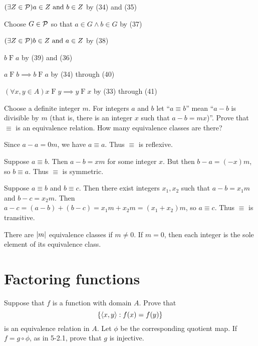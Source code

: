 \begin{solution}
\begin{enumarabic}
    \item \quad\quad $(\exists Z\in\mathcal{P})a\in Z\text{ and } b\in Z$ \hfill by (34) and (35)
    \item \quad\quad Choose $G\in\mathcal{P}$ so that $a\in G\land b\in G$ \hfill by (37)
    \item \quad\quad $(\exists Z\in\mathcal{P})b\in Z\text{ and } a\in Z$ \hfill by (38)
    \item \quad\quad $b\mathrel F a$ \hfill by (39) and (36)
    \item \quad $a\mathrel F b \implies b\mathrel F a$ \hfill by (34) through (40)
    \item $(\forall x, y\in A)x\mathrel F y \implies y \mathrel F x$ \hfill by (33) through (41)
\end{enumarabic}
\end{solution}

\begin{exercise}
Choose a definite integer $m$. For integers $a$ and $b$ let ``$a\equiv b$'' mean
``$a - b$ is divisible by $m$ (that is, there is an integer $x$ such that $a-b=mx$)''.
Prove that $\equiv$ is an equivalence relation. How many equivalence classes are there?
\end{exercise}

\begin{solution}
Since $a-a=0m$, we have $a\equiv a$. Thus $\equiv$ is reflexive.

Suppose $a\equiv b$. Then $a-b=xm$ for some integer $x$. But then $b-a=(-x)m$,
so $b\equiv a$. Thus $\equiv$ is symmetric.

Suppose $a\equiv b$ and $b\equiv c$. Then there exist integers $x_1,x_2$ such that
$a-b=x_1m$ and $b-c=x_2m$.
Then $a-c=(a-b)+(b-c)=x_1m+x_2m=(x_1+x_2)m$, so $a\equiv c$. Thus $\equiv$ is transitive.

There are $\left\lvert m\right\rvert$ equivalence classes if $m\neq 0$. If $m=0$, then each integer is
the sole element of its equivalence class.
\end{solution}
\section{Factoring functions}

\begin{exercise}
Suppose that $f$ is a function with domain $A$. Prove that
\[\left\{ \left\langle x,y\right\rangle : f(x)=f(y) \right\}\]
is an equivalence relation in $A$. Let $\phi$ be the corresponding quotient map.
If $f = g\circ \phi$,
as in 5-2.1, prove that $g$ is injective.
\end{exercise}


